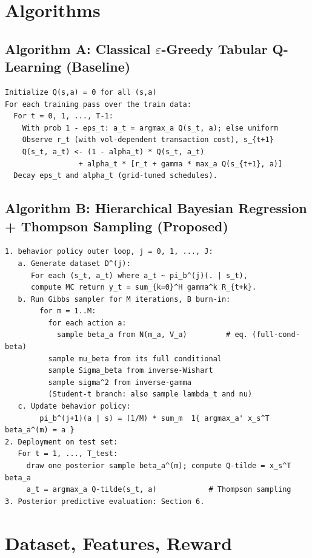 \documentclass[11pt]{article}
\begin{document}
\newpage

\section{Algorithms}

\subsection*{Algorithm A: Classical $\varepsilon$-Greedy Tabular Q-Learning (Baseline)}

\begin{lstlisting}
Initialize Q(s,a) = 0 for all (s,a)
For each training pass over the train data:
  For t = 0, 1, ..., T-1:
    With prob 1 - eps_t: a_t = argmax_a Q(s_t, a); else uniform
    Observe r_t (with vol-dependent transaction cost), s_{t+1}
    Q(s_t, a_t) <- (1 - alpha_t) * Q(s_t, a_t)
                 + alpha_t * [r_t + gamma * max_a Q(s_{t+1}, a)]
  Decay eps_t and alpha_t (grid-tuned schedules).
\end{lstlisting}

\subsection*{Algorithm B: Hierarchical Bayesian Regression + Thompson Sampling (Proposed)}

\begin{lstlisting}
1. behavior policy outer loop, j = 0, 1, ..., J:
   a. Generate dataset D^(j):
      For each (s_t, a_t) where a_t ~ pi_b^(j)(. | s_t),
      compute MC return y_t = sum_{k=0}^H gamma^k R_{t+k}.
   b. Run Gibbs sampler for M iterations, B burn-in:
        for m = 1..M:
          for each action a:
            sample beta_a from N(m_a, V_a)         # eq. (full-cond-beta)
          sample mu_beta from its full conditional
          sample Sigma_beta from inverse-Wishart
          sample sigma^2 from inverse-gamma
          (Student-t branch: also sample lambda_t and nu)
   c. Update behavior policy:
        pi_b^(j+1)(a | s) = (1/M) * sum_m  1{ argmax_a' x_s^T beta_a^(m) = a }
2. Deployment on test set:
   For t = 1, ..., T_test:
     draw one posterior sample beta_a^(m); compute Q-tilde = x_s^T beta_a
     a_t = argmax_a Q-tilde(s_t, a)            # Thompson sampling
3. Posterior predictive evaluation: Section 6.
\end{lstlisting}

\newpage

\section{Dataset, Features, Reward}
\label{sec:dataset}
\end{document}

